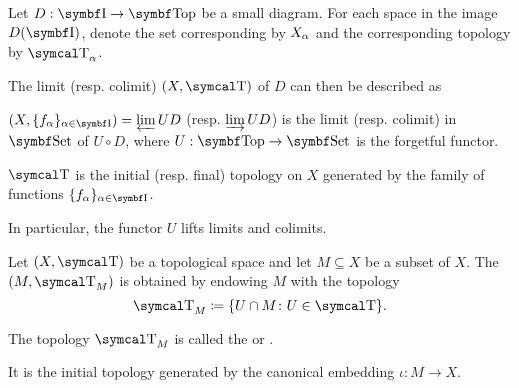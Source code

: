 \begin{proposition}\label{thm:initial_final_topology_limit}\cite{nLab:top}
  Let \( D: \Bold I \to \Cat{Top} \) be a small diagram. For each space in the image \( D(\Bold I) \), denote the set corresponding by \( X_\alpha \) and the corresponding topology by \( \CT_\al \).

  The limit (resp. colimit) \( (X, \CT) \) of \( D \) can then be described as
  \begin{defenum}
    \item \( (X, \{ f_\al \}_{\al \in \Cat{I}}) = \varprojlim UD \) (resp. \( \varinjlim UD \)) is the limit (resp. colimit) in \( \Cat{Set} \) of \( U \circ D \), where \( U: \Bold{Top} \to \Cat{Set} \) is the forgetful functor.
    \item \( \CT \) is the initial (resp. final) topology on \( X \) generated by the family of functions \( \{ f_\al \}_{\al \in \Cat{I}} \).
  \end{defenum}

  In particular, the functor \( U \) lifts limits and colimits.
\end{proposition}

\begin{definition}\label{def:topological_subspace}
  Let \( (X, \CT) \) be a topological space and let \( M \subseteq X \) be a subset of \( X \). The  \( (M, \CT_M) \) is obtained by endowing \( M \) with the topology
  \begin{equation*}
    \CT_M \coloneqq \{ U \cap M \colon U \in \CT \}.
  \end{equation*}

  The topology \( \CT_M \) is called the  or .

  It is the initial topology generated by the canonical embedding \( \iota: M \to X \).
\end{definition}

